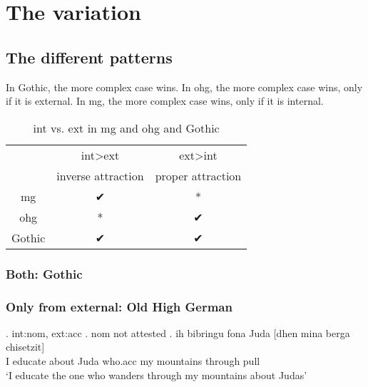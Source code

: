 
\chapter{The variation}


\section{The different patterns}

In Gothic, the more complex case wins.
In \ac{ohg}, the more complex case wins, only if it is external.
In \ac{mg}, the more complex case wins, only if it is internal.


\begin{table}[h]
	\center
	\caption {\ac{int} vs. \ac{ext} in \ac{mg} and \ac{ohg} and Gothic}
		\begin{tabular}{ccc}
		\toprule
		 					& \ac{int}>\ac{ext}		& \ac{ext}>\ac{int}		\\
							& inverse attraction	& proper attraction		\\
								\cmidrule{2-3}
		\ac{mg} 	& ✔			 							&	*										\\
		\ac{ohg}	& *										&	✔										\\
		Gothic		&	✔										&	✔										\\
		\bottomrule
		\end{tabular}
\end{table}



\subsection{Both: Gothic}





\subsection{Only from external: Old High German}


\ex. \ac{int}:\ac{nom}, \ac{ext}:\ac{acc}
\a. \ac{nom} not attested
\bg. ih bibringu fona Juda [dhen mina berga chisetzit]\\
 I educate\scsub{[acc]} about Juda who.\ac{acc} my mountains {through pull}\scsub{[nom]}\\
 `I educate the one who wanders through my mountains about Judas' 

